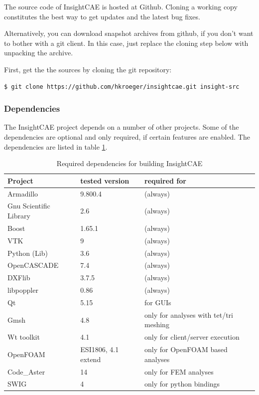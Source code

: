 The source code of InsightCAE is hosted at Github. 
Cloning a working copy constitutes the best way to get updates and the latest bug fixes.

Alternatively, you can download snapshot archives from github, if you don't want to bother with a git client.
In this case, just replace the cloning step below with unpacking the archive.

First, get the the sources by cloning the git repository:
\begin{lstlisting}[language=bash]
$ git clone https://github.com/hkroeger/insightcae.git insight-src
\end{lstlisting}


\subsubsection{Dependencies}

The InsightCAE project depends on a number of other projects.
Some of the dependencies are optional and only required, if certain features are enabled.
The dependencies are listed in table \ref{tab:dependencies}.

\begin{table}[h!]
\centering
\begin{tabular}{lll}
\hline
Project & tested version & required for\\
\hline

Armadillo & 9.800.4 & (always)\\
Gnu Scientific Library & 2.6 & (always)\\
Boost & 1.65.1 &(always) \\
VTK & 9 & (always)\\
Python (Lib) & 3.6 & (always)\\
OpenCASCADE & 7.4 & (always)\\
DXFlib & 3.7.5 & (always)\\
libpoppler & 0.86 & (always) \\
Qt & 5.15 & for GUIs\\
Gmsh & 4.8 & only for analyses with tet/tri meshing\\
Wt toolkit & 4.1 & only for client/server execution\\
OpenFOAM & ESI1806, 4.1 extend & only for OpenFOAM based analyses\\
Code\_Aster & 14 & only for FEM analyses \\
SWIG & 4 & only for python bindings \\
\hline
\end{tabular}
\caption{Required dependencies for building InsightCAE}
\label{tab:dependencies}
\end{table}

